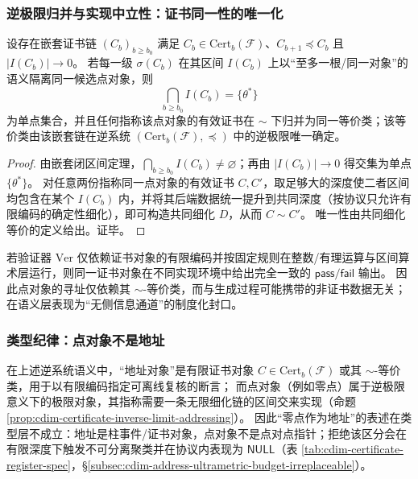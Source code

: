 \subsubsection{逆极限归并与实现中立性：证书同一性的唯一化}
\begin{proposition}[嵌套证书链的逆极限寻址与等价类归并]\label{prop:cdim-certificate-inverse-limit-addressing}
设存在嵌套证书链 \((C_b)_{b\ge b_0}\) 满足 \(C_b\in\mathrm{Cert}_b(\mathcal F)\)、\(C_{b+1}\preceq C_b\) 且 \(|I(C_b)|\to 0\)。
若每一级 \(\sigma(C_b)\) 在其区间 \(I(C_b)\) 上以“至多一根/同一对象”的语义隔离同一候选点对象，则
\[
\bigcap_{b\ge b_0} I(C_b)=\{\theta^\ast\}
\]
为单点集合，并且任何指称该点对象的有效证书在 \(\sim\) 下归并为同一等价类；该等价类由该嵌套链在逆系统 \((\mathrm{Cert}_b(\mathcal F),\preceq)\) 中的逆极限唯一确定。
\end{proposition}
\begin{proof}
由嵌套闭区间定理，\(\bigcap_{b\ge b_0} I(C_b)\neq\varnothing\)；再由 \(|I(C_b)|\to 0\) 得交集为单点 \(\{\theta^\ast\}\)。
对任意两份指称同一点对象的有效证书 \(C,C'\)，取足够大的深度使二者区间均包含在某个 \(I(C_b)\) 内，并将其后端数据统一提升到共同深度（按协议只允许有限编码的确定性细化），即可构造共同细化 \(D\)，从而 \(C\sim C'\)。
唯一性由共同细化等价的定义给出。证毕。
\end{proof}

\begin{remark}[实现中立性与无侧信息通道]\label{rem:cdim-implementation-neutrality-offline}
若验证器 \(\mathrm{Ver}\) 仅依赖证书对象的有限编码并按固定规则在整数/有理运算与区间算术层运行，则同一证书对象在不同实现环境中给出完全一致的 \(\mathsf{pass}/\mathsf{fail}\) 输出。
因此点对象的寻址仅依赖其 \(\sim\)-等价类，而与生成过程可能携带的非证书数据无关；在语义层表现为“无侧信息通道”的制度化封口。
\end{remark}

\subsubsection{类型纪律：点对象不是地址}
\begin{remark}\label{rem:cdim-zero-not-address}
在上述逆系统语义中，“地址对象”是有限证书对象 \(C\in\mathrm{Cert}_b(\mathcal F)\) 或其 \(\sim\)-等价类，用于以有限编码指定可离线复核的断言；
而点对象（例如零点）属于逆极限意义下的极限对象，其指称需要一条无限细化链的区间交来实现（命题 \ref{prop:cdim-certificate-inverse-limit-addressing}）。
因此“零点作为地址”的表述在类型层不成立：地址是柱事件/证书对象，点对象不是点对点指针；拒绝该区分会在有限深度下触发不可分离聚类并在协议内表现为 \(\mathsf{NULL}\)（表 \ref{tab:cdim-certificate-register-spec}，\S\ref{subsec:cdim-address-ultrametric-budget-irreplaceable}）。
\end{remark}

